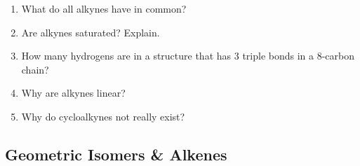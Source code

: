 \documentclass[12pt]{article}
\begin{document}
\begin{enumerate}[label=\arabic*.]
    \item What do all alkynes have in common?
    \vspace{1.5cm}
    \item Are alkynes saturated? Explain.
    \vspace{1.5cm}
    \item How many hydrogens are in a structure that has 3 triple bonds in a 8-carbon chain?
    \vspace{1.5cm}
    \item Why are alkynes linear?
    \vspace{1.5cm}
    \item Why do cycloalkynes not really exist?
    \vspace{1.5cm}
\end{enumerate}

\begin{center}
    \subsection*{Geometric Isomers \& Alkenes}
\end{center}
\end{document}
